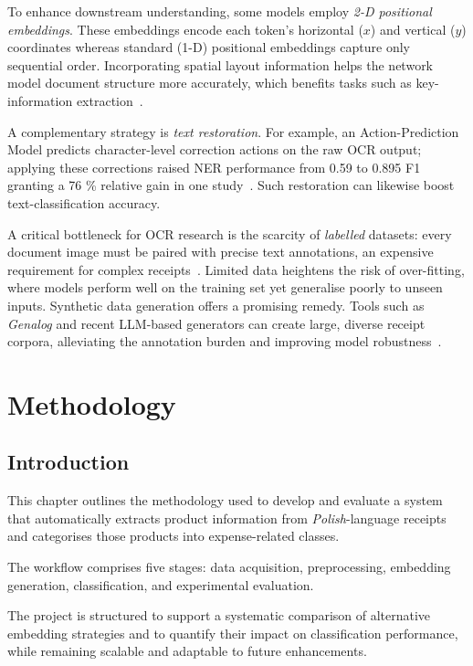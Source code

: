 \documentclass{SGGW-thesis-EN}
\begin{document}
To enhance downstream understanding, some models employ \emph{2-D positional embeddings}.
These embeddings encode each token’s horizontal (\(x\)) and vertical (\(y\)) coordinates
whereas standard (1-D) positional embeddings capture only sequential order.
Incorporating spatial layout information helps the network model document structure more
accurately, which benefits tasks such as key-information extraction~\cite{subramani2021surveydeeplearningapproaches}.

A complementary strategy is \emph{text restoration}.
For example, an Action-Prediction Model predicts character-level correction actions on the
raw OCR output; applying these corrections raised NER performance from 0.59 to 0.895 F1 granting
a 76 \% relative gain in one study~\cite{gupte2021lightscameraactionframework}.
Such restoration can likewise boost text-classification accuracy.

A critical bottleneck for OCR research is the scarcity of \emph{labelled} datasets: every
document image must be paired with precise text annotations, an expensive requirement for
complex receipts~\cite{subramani2021surveydeeplearningapproaches}.
Limited data heightens the risk of over-fitting, where models perform well on the training
set yet generalise poorly to unseen inputs.
Synthetic data generation offers a promising remedy.
Tools such as \textit{Genalog} and recent LLM-based generators can create large, diverse
receipt corpora, alleviating the annotation burden and improving model robustness~\cite{gupte2021lightscameraactionframework}.


\chapter{Methodology}
\section{Introduction}

This chapter outlines the methodology used to develop and evaluate a system that
automatically extracts product information from \textit{Polish}-language receipts and
categorises those products into expense-related classes.

The workflow comprises five stages: data acquisition, preprocessing, embedding generation,
classification, and experimental evaluation.

The project is structured to support a systematic comparison of alternative embedding
strategies and to quantify their impact on classification performance, while remaining
scalable and adaptable to future enhancements.
\end{document}
